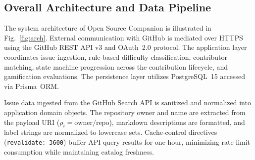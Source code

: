 \documentclass[conference]{IEEEtran}
\begin{document}
\subsection{Overall Architecture and Data Pipeline}
The system architecture of Open Source Companion is illustrated in Fig.~\ref{fig:arch}. External communication with GitHub is mediated over HTTPS using the GitHub REST API v3 and OAuth~2.0 protocol. The application layer coordinates issue ingestion, rule-based difficulty classification, contributor matching, state machine progression across the contribution lifecycle, and gamification evaluations. The persistence layer utilizes PostgreSQL~15 accessed via Prisma~ORM.

Issue data ingested from the GitHub Search API is sanitized and normalized into application domain objects. The repository owner and name are extracted from the payload URI ($\rho_i = \text{owner}/\text{repo}$), markdown descriptions are formatted, and label strings are normalized to lowercase sets. Cache-control directives (\texttt{revalidate: 3600}) buffer API query results for one hour, minimizing rate-limit consumption while maintaining catalog freshness.
\end{document}
